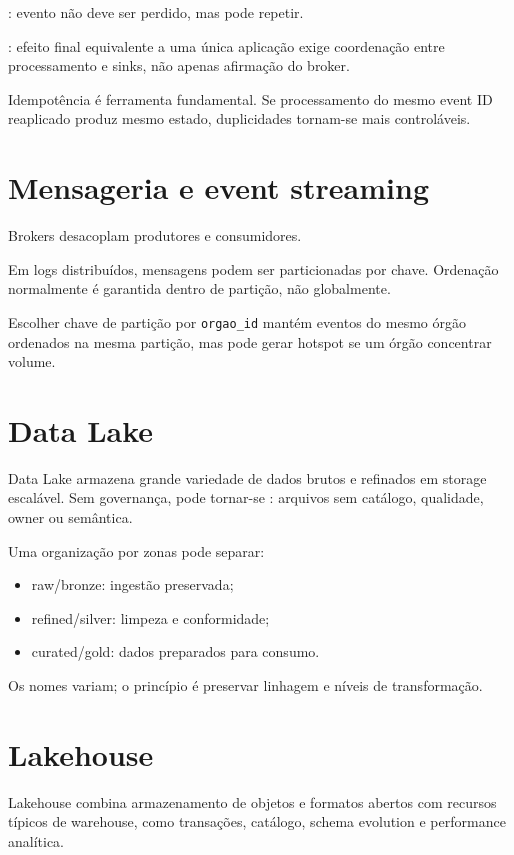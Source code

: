 : evento não deve ser perdido, mas pode repetir.

: efeito final equivalente a uma única aplicação exige coordenação entre processamento e sinks, não apenas afirmação do broker.

Idempotência é ferramenta fundamental. Se processamento do mesmo event ID reaplicado produz mesmo estado, duplicidades tornam-se mais controláveis.

\section{Mensageria e event streaming}

Brokers desacoplam produtores e consumidores.

Em logs distribuídos, mensagens podem ser particionadas por chave. Ordenação normalmente é garantida dentro de partição, não globalmente.

Escolher chave de partição por \texttt{orgao_id} mantém eventos do mesmo órgão ordenados na mesma partição, mas pode gerar hotspot se um órgão concentrar volume.

\section{Data Lake}

Data Lake armazena grande variedade de dados brutos e refinados em storage escalável. Sem governança, pode tornar-se : arquivos sem catálogo, qualidade, owner ou semântica.

Uma organização por zonas pode separar:
\begin{itemize}
\item raw/bronze: ingestão preservada;
\item refined/silver: limpeza e conformidade;
\item curated/gold: dados preparados para consumo.
\end{itemize}

Os nomes variam; o princípio é preservar linhagem e níveis de transformação.

\section{Lakehouse}

Lakehouse combina armazenamento de objetos e formatos abertos com recursos típicos de warehouse, como transações, catálogo, schema evolution e performance analítica.

